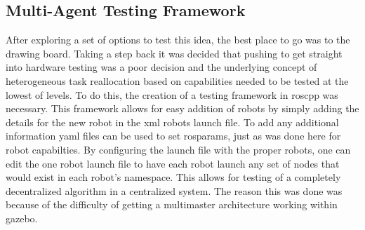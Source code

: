 %


\subsection{Multi-Agent Testing Framework}

After exploring a set of options to test this idea, the best place to go was to the drawing
board. Taking a step back it was decided that pushing to get straight into hardware testing
was a poor decision and the underlying concept of heterogeneous task reallocation based on
capabilities needed to be tested at the lowest of levels. To do this, the creation of a testing
framework in roscpp was necessary. This framework allows for easy addition of robots by simply
adding the details for the new robot in the xml robots launch file. To add any additional information
yaml files can be used to set rosparams, just as was done here for robot capabilties. By configuring
the launch file with the proper robots, one can edit the one robot launch file to have each robot launch
any set of nodes that would exist in each robot's namespace. This allows for testing of a completely
decentralized algorithm in a centralized system. The reason this was done was because of the difficulty
of getting a multimaster architecture working within gazebo.
